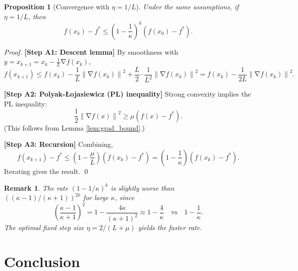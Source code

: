 \documentclass[11pt]{article}
\newtheorem{proposition}{Proposition}
\newtheorem{remark}{Remark}
\DeclareMathOperator{\grad}{\nabla}
\newcommand{\norm}[1]{\left\|#1\right\|}
\begin{document}
\begin{proposition}[Convergence with $\eta = 1/L$] \label{prop:eta_1_over_L}
    Under the same assumptions, if $\eta = 1/L$, then
    \begin{equation}
        f(x_k) - f^* \le \left( 1 - \frac{1}{\kappa} \right)^k \left( f(x_0) - f^* \right).
    \end{equation}
\end{proposition}
\begin{proof}
    \textbf{[Step A1: Descent lemma]} By smoothness with $y = x_{k+1} = x_k - \frac{1}{L}\grad f(x_k)$,
    \begin{equation}
        f(x_{k+1}) \le f(x_k) - \frac{1}{L}\norm{\grad f(x_k)}^2 + \frac{L}{2}\cdot\frac{1}{L^2}\norm{\grad f(x_k)}^2
        = f(x_k) - \frac{1}{2L}\norm{\grad f(x_k)}^2.
    \end{equation}

    \textbf{[Step A2: Polyak-Łojasiewicz (PL) inequality]} Strong convexity implies the PL inequality:
    \begin{equation}
        \frac{1}{2}\norm{\grad f(x)}^2 \ge \mu (f(x) - f^*).
    \end{equation}
    (This follows from Lemma \ref{lem:grad_bound}.)

    \textbf{[Step A3: Recursion]} Combining,
    \begin{equation}
        f(x_{k+1}) - f^* \le \left( 1 - \frac{\mu}{L} \right) (f(x_k) - f^*) = \left( 1 - \frac{1}{\kappa} \right) (f(x_k) - f^*).
    \end{equation}
    Iterating gives the result. \qed
\end{proof}

\begin{remark}
    The rate $(1 - 1/\kappa)^k$ is slightly worse than $((\kappa-1)/(\kappa+1))^{2k}$ for large $\kappa$, since
    \begin{equation}
        \left( \frac{\kappa-1}{\kappa+1} \right)^2 = 1 - \frac{4\kappa}{(\kappa+1)^2} \approx 1 - \frac{4}{\kappa} \quad \text{vs} \quad 1 - \frac{1}{\kappa}.
    \end{equation}
    The optimal fixed step size $\eta = 2/(L+\mu)$ yields the faster rate.
\end{remark}

\section{Conclusion}
\end{document}
